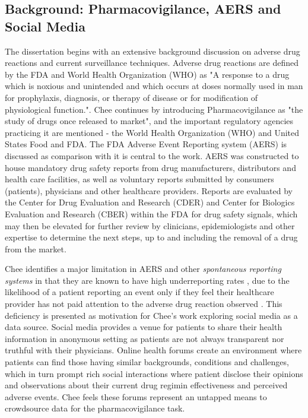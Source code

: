 \documentclass[twoside,11pt]{article}
\begin{document}
\subsection{Background: Pharmacovigilance, AERS and Social Media}
The dissertation begins with an extensive background discussion on adverse drug reactions and current surveillance techniques. Adverse drug reactions are defined by the FDA and World Health Organization (WHO) as "A response to a drug which is noxious and unintended and which occurs at doses normally used in man for prophylaxis, diagnosis, or therapy of disease or for modification of physiological function."\cite{FDA}. Chee continues by introducing Pharmacovigilance as "the study of drugs once released to market", and the important regulatory agencies practicing it are mentioned - the World Health Organization (WHO) and United States Food and FDA. The FDA Adverse Event Reporting system (AERS) is discussed as comparison with it is central to the work. AERS was constructed to house mandatory drug safety reports from drug manufacturers, distributors and health care facilities, as well as voluntary reports submitted by consumers (patients), physicians and other healthcare providers. Reports are evaluated by the Center for Drug Evaluation and Research (CDER) and Center for Biologics Evaluation and Research (CBER) within the FDA for drug safety signals, which may then be elevated for further review by clinicians, epidemiologists and other expertise to determine the next steps, up to and including the removal of a drug from the market.

Chee identifies a major limitation in AERS and other \textit{spontaneous reporting systems} in that they are known to have high underreporting rates \citep{Fletcher}, due to the likelihood of a patient reporting an event only if they feel their healthcare provider has not paid attention to the adverse drug reaction observed \citep{Leamon}. This deficiency is presented as motivation for Chee's work exploring social media as a data source. Social media provides a venue for patients to share their health information in anonymous setting as patients are not always transparent nor truthful with their physicians. Online health forums create an environment where patients can find those having similar backgrounds, conditions and challenges, which in turn prompt rich social interactions where patient disclose their opinions and observations about their current drug regimin effectiveness and perceived adverse events. Chee feels these forums represent an untapped means to crowdsource data for the pharmacovigilance task.
\end{document}
